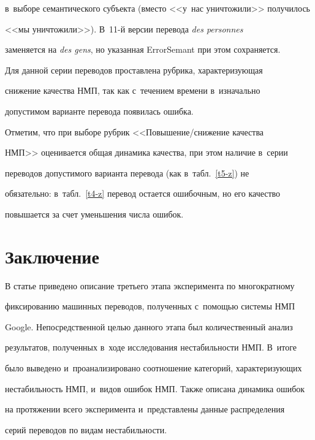 в~выборе семантического субъекта (вместо <<у~нас уничтожили>> получилось 


<<мы уничтожили>>). В~11-й версии перевода \textit{des personnes} 


заменяется на \textit{des gens}, но указанная \mbox{ErrorSemant} при этом сохраняется.


  


  Для данной серии переводов проставлена рубрика, характеризующая 


снижение качества НМП, так как  с~течением времени в~изначально 


допустимом варианте перевода появилась ошибка.


  


  Отметим, что при выборе рубрик <<Повышение\!/\!сни\-же\-ние качества 


НМП>> оценивается общая динамика качества, при этом наличие в~серии 


переводов допустимого варианта перевода (как в~табл.~\ref{t5-z}) не 


обязательно: в~табл.~\ref{t4-z} перевод остается ошибочным, но его качество 


повышается за счет уменьшения числа ошибок.


  


\section{Заключение}


  


  В статье приведено описание третьего этапа эксперимента по многократному 


фиксированию машинных переводов, полученных с~помощью системы НМП 


Google. Непосредственной целью данного этапа был количественный анализ 


результатов, полученных в~ходе исследования нестабильности НМП. В~итоге 


было выведено и~проанализировано соотношение категорий, характеризующих 


нестабильность НМП, и~видов ошибок НМП. Также описана динамика ошибок 


на протяжении всего эксперимента и~представлены данные распределения 


серий переводов по видам нестабильности.


